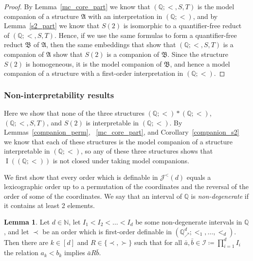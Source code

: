 \documentclass{amsart}
\theoremstyle{definition}
\newtheorem{lemma}[theorem]{Lemma}
\theoremstyle{remark}
\numberwithin{equation}{section}
\DeclareMathOperator{\I}{\operatorname{I}}
\newcommand{\order}{(\mathbb{Q};<)}
\newcommand\johnord[1]{\mathcal{J}^{<}(#1)}
\newcommand{\bA}{\mathfrak{A}}
\newcommand{\bB}{\mathfrak{B}}
\newcommand\qup[1]{\mathbb{Q}_\nearrow^{#1}}
\begin{document}
\begin{proof}
    By Lemma~\ref{mc_core_part} we know that $({\mathbb Q};<,S,T)$ is the model companion of a structure $\bA$ with an interpretation in $({\mathbb Q};<)$, and by Lemma~\ref{s2_part} we know that $S(2)$ is isomorphic to a quantifier-free  reduct of $({\mathbb Q};{<},S,T)$.  Hence, if we use the same formulas to form a quantifier-free reduct $\bB$
    of $\bA$, then 
    the same embeddings that show that $({\mathbb Q};<,S,T)$ is a companion of $\bA$ show that $S(2)$ is a companion of $\bB$. 
    Since the structure 
    $S(2)$ is homogeneous, it is the model companion of $\bB$, and hence a model companion of a structure with a first-order {interpretation} in $({\mathbb Q};<)$.
\end{proof}

\subsubsection{Non-interpretability results}
    Here 
    we show that none of the three structures $(\mathbb{Q};<)*(\mathbb{Q};<)$,  $(\mathbb{Q};<,S,T)$, and $S(2)$ is interpretable in $\order$. By Lemmas~\ref{companion_perm}, ~\ref{mc_core_part}, and Corollary~\ref{companion_s2} we know that 
    each of these structures is the model companion of a structure
    interpretable in $\order$, so 
    any of these three structures shows that $\I(\order)$ is not closed under taking model companions.
    
	We first show that every order which is definable in $\johnord{d}$ equals a lexicographic order up to a permutation of the coordinates and the reversal of the order of some of the coordinates. We say that an interval of $\mathbb{Q}$ is \emph{non-degenerate} if it contains at least 2 elements. 
	
\begin{lemma}\label{most_sign}
	Let $d\in \mathbb{N}$, let $I_1<I_2<\dots<I_d$ be some non-degenerate intervals in $\mathbb{Q}$,
    and let $\prec$ be an order which is first-order definable in $(\qup{d};<_1,\dots,<_d)$. Then there are $k\in [d]$ and $R\in \{\prec,\succ\}$ such that for all $\bar{a},\bar{b}\in \mathcal{I}\coloneqq \prod_{i=1}^dI_i$ the relation $a_k<b_k$ implies $\bar{a}R\bar{b}$.
\end{lemma}
\end{document}
